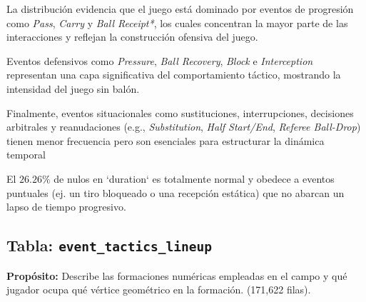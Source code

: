 \documentclass[12pt,a4paper]{article}
\begin{document}
La distribución evidencia que el juego está dominado por eventos de progresión como \textit{Pass}, \textit{Carry} y \textit{Ball Receipt*}, los cuales concentran la mayor parte de las interacciones y reflejan la construcción ofensiva del juego.

Eventos defensivos como \textit{Pressure}, \textit{Ball Recovery}, \textit{Block} e \textit{Interception} representan una capa significativa del comportamiento táctico, mostrando la intensidad del juego sin balón.

Finalmente, eventos situacionales como sustituciones, interrupciones, decisiones arbitrales y reanudaciones (e.g., \textit{Substitution}, \textit{Half Start/End}, \textit{Referee Ball-Drop}) tienen menor frecuencia pero son esenciales para estructurar la dinámica temporal

El $26.26\%$ de nulos en `duration` es totalmente normal y obedece a eventos puntuales (ej. un tiro bloqueado o una recepción estática) que no abarcan un lapso de tiempo progresivo.
\subsection{Tabla: \texttt{event\_tactics\_lineup}}

\textbf{Propósito:} Describe las formaciones numéricas empleadas en el campo y qué jugador ocupa qué vértice geométrico en la formación. (171,622 filas).
\end{document}
